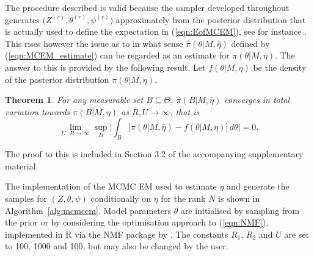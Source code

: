 \documentclass{bioinfo}
\newtheorem{thrm}{Theorem}
\begin{document}
The procedure described is valid because the sampler developed
throughout generates $\big(Z^{(r)}, \theta^{(r)}, \psi^{(r)}\big)$
approximately from the posterior distribution that is actually used to
define the expectation in (\ref{eqn:EofMCEM}), see for instance
\cite{FM}. This rises however the issue as to in what sense
$\widehat\pi(\theta|M, \hat\eta)$ defined by (\ref{eqn:MCEM_estimate})
can be regarded as an estimate for $\pi(\theta|M, \eta)$. The answer
to this is provided by the following result. Let $f(\theta|M, \eta)$
be the density of the posterior distribution $\pi(\theta|M, \eta)$.

\begin{thrm} For any measurable set $B\subseteq \Theta$,
 $\widehat\pi(B|M,\hat\eta)$ converges in total variation
towards $\pi(B|M,\eta)$ as $R, U \to \infty$, that is
\[
   \lim_{U,\ R\to\infty}
   \sup_{B}
    \bigg|
     \int_B
     \Big[
       \widehat \pi(\theta|M, \hat\eta) - f(\theta|M,\eta)
     \Big]\, d\theta
    \bigg|
   = 0.
\]
\end{thrm}

The proof to this is included in Section 3.2 of the accompanying 
supplementary material. 

The implementation of the MCMC EM used to estimate $\eta$ and generate
the samples for $(Z, \theta, \psi)$ conditionally on $\eta$ for the
rank $N$ is shown in Algorithm~\ref{alg:mcmcem}. Model parameters
$\theta$ are initialised by sampling from the prior or by considering
the optimisation approach to (\ref{eqn:NMF}), implemented in R via the
NMF package by \cite{GS}. The constants $R_1$, $R_2$ and $U$ are set
to 100, 1000 and 100, but may also be changed by the user.
\end{document}
